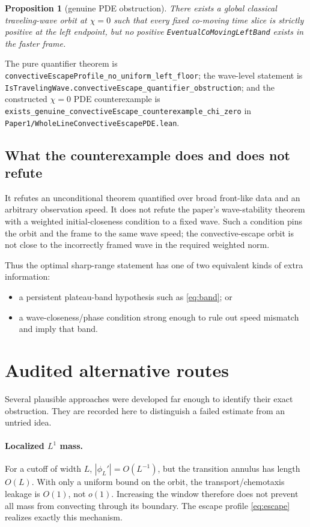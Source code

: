 \documentclass[11pt]{article}
\newcommand{\abs}[1]{\left\lvert #1\right\rvert}
\newcommand{\code}[1]{\nolinkurl{#1}}
\newtheorem{proposition}{Proposition}
\begin{document}
\begin{proposition}[genuine PDE obstruction]
There exists a global classical traveling-wave orbit at \(\chi=0\) such that
every fixed co-moving time slice is strictly positive at the left endpoint,
but no positive \code{EventualCoMovingLeftBand} exists in the faster frame.
\end{proposition}

\noindent The pure quantifier theorem is
\code{convectiveEscapeProfile_no_uniform_left_floor}; the wave-level
statement is
\code{IsTravelingWave.convectiveEscape_quantifier_obstruction}; and the
constructed \(\chi=0\) PDE counterexample is
\code{exists_genuine_convectiveEscape_counterexample_chi_zero} in
\code{Paper1/WholeLineConvectiveEscapePDE.lean}.

\subsection{What the counterexample does and does not refute}

It refutes an unconditional theorem quantified over broad front-like data
and an arbitrary observation speed.  It does not refute the paper's
wave-stability theorem with a weighted initial-closeness condition to a fixed
wave.  Such a condition pins the orbit and the frame to the same wave speed;
the convective-escape orbit is not close to the incorrectly framed wave in
the required weighted norm.

Thus the optimal sharp-range statement has one of two equivalent kinds of
extra information:
\begin{itemize}[leftmargin=2em]
\item a persistent plateau-band hypothesis such as \eqref{eq:band}; or
\item a wave-closeness/phase condition strong enough to rule out speed
  mismatch and imply that band.
\end{itemize}

\section{Audited alternative routes}

Several plausible approaches were developed far enough to identify their
exact obstruction.  They are recorded here to distinguish a failed estimate
from an untried idea.

\paragraph{Localized \(L^1\) mass.}
For a cutoff of width \(L\), \(\abs{\phi_L'}=O(L^{-1})\), but the transition
annulus has length \(O(L)\).  With only a uniform bound on the orbit, the
transport/chemotaxis leakage is \(O(1)\), not \(o(1)\).  Increasing the window
therefore does not prevent all mass from convecting through its boundary.
The escape profile \eqref{eq:escape} realizes exactly this mechanism.
\end{document}
